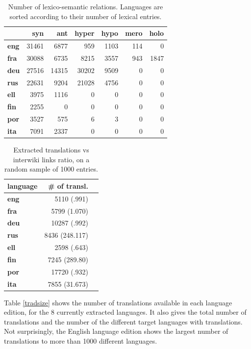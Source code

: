 \documentclass[sw]{iosart2c}
\begin{document}
\begin{table}[htb]
\begin{tabular}{lrrrrrr}
 & \textbf{syn}  & \textbf{ant} & \textbf{hyper} & \textbf{hypo} & \textbf{mero} & \textbf{holo} \\
 \hline
\textbf{eng} & 31461& 6877& 959& 1103& 114& 0 \\ 
\textbf{fra} & 30088& 6735& 8215& 3557& 943& 1847 \\ 
\textbf{deu} & 27516& 14315& 30202& 9509& 0& 0 \\ 
\textbf{rus} & 22631& 9204& 21028& 4756& 0& 0 \\ 
\textbf{ell} & 3975& 1116& 0& 0& 0& 0 \\ 
\textbf{fin} & 2255& 0& 0& 0& 0& 0 \\ 
\textbf{por} & 3527& 575& 6& 3& 0& 0 \\ 
\textbf{ita} & 7091& 2337& 0& 0& 0& 0 \\ 
\end{tabular}
\caption{Number of lexico-semantic relations. Languages are sorted according to their number of lexical entries.}\label{nymsize}
\end{table}

\begin{table}[htb]
\begin{tabular}{lrr}
\textbf{language} & \textbf{\# of transl.}\\
 \hline
\textbf{eng} & 5110 (.991) \\
\textbf{fra} & 5799 (1.070) \\
\textbf{deu} & 10287 (.992)\\
\textbf{rus} & 8436 (248.117) \\
\textbf{ell} & 2598 (.643) \\
\textbf{fin} & 7245 (289.80) \\
\textbf{por} & 17720 (.932) \\
\textbf{ita} & 7855 (31.673) 
\end{tabular}
\caption{Extracted translations vs interwiki links ratio, on a random sample of 1000 entries.}\label{iwlinks}
\end{table}

Table \ref{tradsize} shows the number of translations available in each language edition, for the 8 currently extracted languages. It also gives the total number of translations and the number of the different target languages with translations. Not surprisingly, the English language edition shows the largest number of translations to more than 1000 different languages. 
\end{document}
